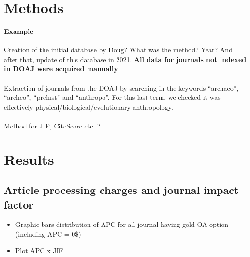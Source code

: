 \documentclass[fleqn,10pt,lineno]{wlpeerj} %
\providecommand{\tightlist}{
\setlength{\itemsep}{0pt}\setlength{\parskip}{0pt}}
\begin{document}
\hypertarget{methods}{%
\section*{Methods}\label{methods}}

\paragraph{Example}

Creation of the initial database by Doug? What was the method? Year? And after that, update of this database in 2021. \textbf{All data for journals not indexed in DOAJ were acquired manually}

\paragraph{}

Extraction of journals from the DOAJ by searching in the keywords ``archaeo'', ``archeo'', ``prehist'' and ``anthropo''. For this last term, we checked it was effectively physical/biological/evolutionary anthropology.

\paragraph{}

Method for JIF, CiteScore etc. ?

\hypertarget{results}{%
\section*{Results}\label{results}}

\hypertarget{article-processing-charges-and-journal-impact-factor}{%
\subsection*{Article processing charges and journal impact factor}\label{article-processing-charges-and-journal-impact-factor}}

\begin{itemize}
\tightlist
\item
  Graphic bars distribution of APC for all journal having gold OA option (including APC = 0\$)
\item
  Plot APC x JIF
\end{itemize}
\end{document}
